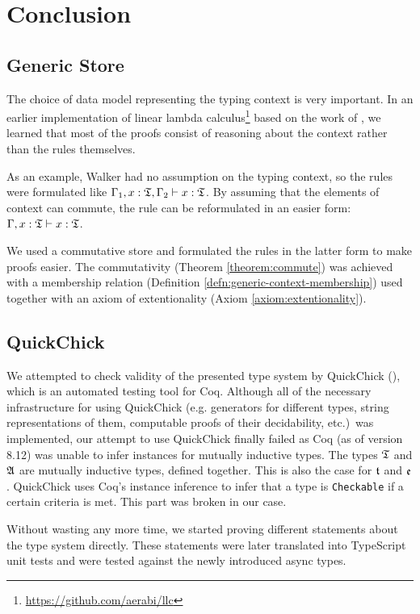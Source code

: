 \chapter{Conclusion}\label{chap:conclusion}

\section{Generic Store}

The choice of data model representing the typing context is very important. In an earlier implementation of linear lambda calculus\footnote{\url{https://github.com/aerabi/llc}} based on the work of \cite{DavidWalker2004}, we learned that most of the proofs consist of reasoning about the context rather than the rules themselves.

As an example, Walker had no assumption on the typing context, so the rules were formulated like $\Gamma_1, x : \mathfrak{T}, \Gamma_2 \vdash x : \mathfrak{T}$. By assuming that the elements of context can commute, the rule can be reformulated in an easier form: $\Gamma, x : \mathfrak{T} \vdash x : \mathfrak{T}$.

We used a commutative store and formulated the rules in the latter form to make proofs easier. The commutativity (Theorem \ref{theorem:commute}) was achieved with a membership relation (Definition \ref{defn:generic-context-membership}) used together with an axiom of extentionality (Axiom \ref{axiom:extentionality}).

\section{QuickChick}

We attempted to check validity of the presented type system by QuickChick (\cite{DBLP:conf/itp/Paraskevopoulou15}), which is an automated testing tool for Coq. Although all of the necessary infrastructure for using QuickChick (e.g. generators for different types, string representations of them, computable proofs of their decidability, etc.)~was implemented, our attempt to use QuickChick finally failed as Coq (as of version 8.12) was unable to infer instances for mutually inductive types. The types $\mathfrak{T}$ and $\mathfrak{A}$ are mutually inductive types, defined together. This is also the case for $\mathfrak{t}$ and $\mathfrak{e}$. QuickChick uses Coq's instance inference to infer that a type is \texttt{Checkable} if a certain criteria is met. This part was broken in our case.

Without wasting any more time, we started proving different statements about the type system directly. These statements were later translated into TypeScript unit tests and were tested against the newly introduced async types.

